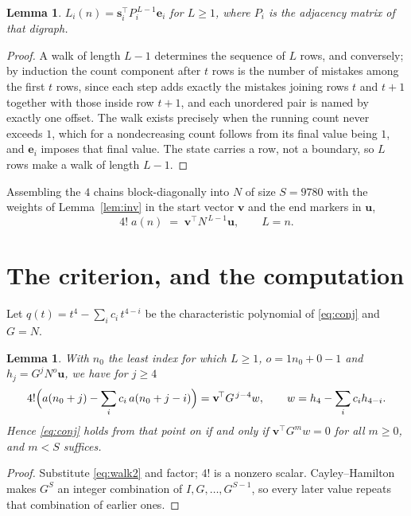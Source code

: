 \documentclass[11pt,a4paper]{article}
\theoremstyle{plain}
\newtheorem{lemma}[theorem]{Lemma}
\theoremstyle{definition}
\begin{document}
\begin{lemma}\label{lem:walk}
$L_i(n)=\mathbf{s}_i^{\!\top}P_i^{\,L-1}\mathbf{e}_i$ for $L\ge1$, where $P_i$ is the
adjacency matrix of that digraph.
\end{lemma}

\begin{proof}
A walk of length $L-1$ determines the sequence of $L$ rows, and conversely; by induction
the count component after $t$ rows is the number of mistakes among the first $t$ rows,
since each step adds exactly the mistakes joining rows $t$ and $t+1$ together with those
inside row $t+1$, and each unordered pair is named by exactly one offset. The walk exists
precisely when the running count never exceeds $1$, which for a nondecreasing count follows
from its final value being $1$, and $\mathbf{e}_i$ imposes that final value. The state
carries a row, not a boundary, so $L$ rows make a walk of length $L-1$.
\end{proof}

Assembling the $4$ chains block-diagonally into $N$ of size $S=9780$ with the weights of
Lemma~\ref{lem:inv} in the start vector $\mathbf{v}$ and the end markers in
$\mathbf{u}$,
\begin{equation}\label{eq:walk2}
4!\;a(n)\;=\;\mathbf{v}^{\!\top}N^{\,L-1}\mathbf{u},\qquad L=n .
\end{equation}

\section{The criterion, and the computation}

Let $q(t)=t^{4}-\sum_i c_i\,t^{4-i}$ be the characteristic polynomial of
\eqref{eq:conj} and $G=N$.

\begin{lemma}\label{lem:crit}
With $n_0$ the least index for which $L\ge1$, $o=1n_0+0-1$ and
$h_j=G^{j}N^{o}\mathbf{u}$, we have for $j\ge4$
\[
4!\Bigl(a(n_0+j)-\sum_i c_i\,a(n_0+j-i)\Bigr)=\mathbf{v}^{\!\top}G^{\,j-4}w,
\qquad w=h_{4}-\sum_i c_ih_{4-i} .
\]
Hence \eqref{eq:conj} holds from that point on if and only if
$\mathbf{v}^{\!\top}G^{m}w=0$ for all $m\ge0$, and $m<S$ suffices.
\end{lemma}

\begin{proof}
Substitute \eqref{eq:walk2} and factor; $4!$ is a nonzero scalar. Cayley--Hamilton
makes $G^{S}$ an integer combination of $I,G,\dots,G^{S-1}$, so every later value repeats
that combination of earlier ones.
\end{proof}
\end{document}
